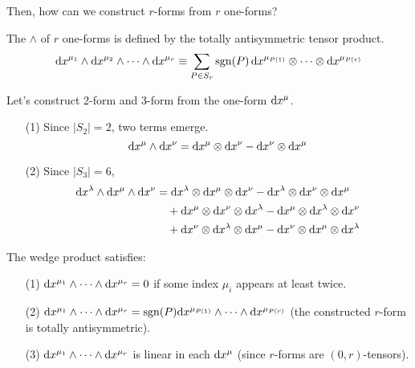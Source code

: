 \documentclass[a4paper, 10pt]{article}
\begin{document}
Then, how can we construct $r$-forms from $r$ one-forms?

\begin{definition}
    The  $\wedge$ of $r$ one-forms is defined by the totally antisymmetric tensor product.
    \[ \mathrm{d}{x}^{\mu_{1}} \wedge \mathrm{d}{x}^{\mu_{2}} \wedge \cdots \wedge \mathrm{d}{x}^{\mu_{r}} \equiv \sum_{P \in S_{r}} \mathrm{sgn}(P) \,\mathrm{d}{x}^{\mu_{P(1)}} \otimes \cdots \otimes \mathrm{d}{x}^{\mu_{P(r)}} \]
\end{definition}
\newpage


\begin{example}
    Let's construct 2-form and 3-form from the one-form $\mathrm{d}{x}^{\mu}$.
    \begin{itemize}
        \item[(1)] Since $|S_{2}| = 2$, two terms emerge.
        \[ \mathrm{d}{x}^{\mu} \wedge \mathrm{d}{x}^{\nu} = \mathrm{d}{x}^{\mu} \otimes \mathrm{d}{x}^{\nu} - \mathrm{d}{x}^{\nu} \otimes \mathrm{d}{x}^{\mu} \]
        \item[(2)] Since $|S_{3}| = 6$,
        \begin{align*}
            \mathrm{d}{x}^{\lambda} \wedge \mathrm{d}{x}^{\mu} \wedge \mathrm{d}{x}^{\nu} &= \mathrm{d}{x}^{\lambda} \otimes \mathrm{d}{x}^{\mu} \otimes \mathrm{d}{x}^{\nu} - \mathrm{d}{x}^{\lambda} \otimes \mathrm{d}{x}^{\nu} \otimes \mathrm{d}{x}^{\mu} \\
            & \quad+ \mathrm{d}{x}^{\mu} \otimes \mathrm{d}{x}^{\nu} \otimes \mathrm{d}{x}^{\lambda} - \mathrm{d}{x}^{\mu} \otimes \mathrm{d}{x}^{\lambda} \otimes \mathrm{d}{x}^{\nu} \\
            & \quad+ \mathrm{d}{x}^{\nu} \otimes \mathrm{d}{x}^{\lambda} \otimes \mathrm{d}{x}^{\mu} - \mathrm{d}{x}^{\nu} \otimes \mathrm{d}{x}^{\mu} \otimes \mathrm{d}{x}^{\lambda}
        \end{align*}
    \end{itemize}
\end{example}

\begin{obs}
    The wedge product satisfies:
    \begin{itemize}
        \item[(1)] $\mathrm{d}{x}^{\mu_{1}} \wedge \cdots \wedge \mathrm{d}{x}^{\mu_{r}} = 0$ if some index $\mu_{i}$ appears at least twice.
        \item[(2)] $\mathrm{d}{x}^{\mu_{1}} \wedge \cdots \wedge \mathrm{d}{x}^{\mu_{r}} = \mathrm{sgn}(P)\mathrm{d}{x}^{\mu_{P(1)}} \wedge \cdots \wedge \mathrm{d}{x}^{\mu_{P(r)}}$ (the constructed $r$-form is totally antisymmetric).
        \item[(3)] $\mathrm{d}{x}^{\mu_{1}} \wedge \cdots \wedge \mathrm{d}{x}^{\mu_{r}}$ is linear in each $\mathrm{d}{x}^{\mu}$ (since $r$-forms are $(0,r)$-tensors).
    \end{itemize}
\end{obs}
\end{document}
